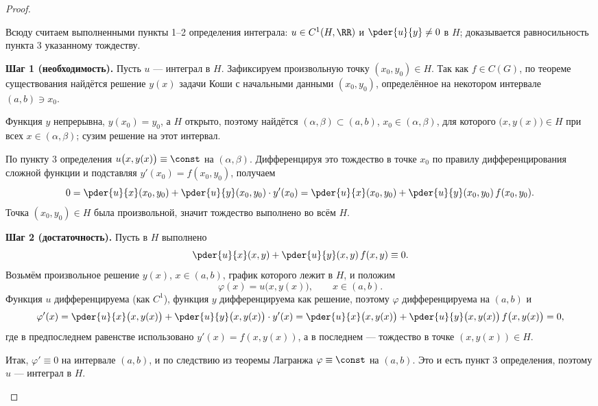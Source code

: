 \begin{proof}
	\begin{Addon}
		Всюду считаем выполненными пункты 1--2 определения интеграла:
		$u \in C^1(H,\RR)$ и $\pder{u}{y} \neq 0$ в $H$; доказывается
		равносильность пункта 3 указанному тождеству.

		\medskip
		\textbf{Шаг 1 (необходимость).} Пусть $u$ --- интеграл в $H$. Зафиксируем
		произвольную точку $(x_0,y_0) \in H$. Так как $f \in C(G)$, по теореме
		существования найдётся решение $y(x)$ задачи Коши с начальными данными
		$(x_0,y_0)$, определённое на некотором интервале $(a,b) \ni x_0$.

		Функция $y$ непрерывна, $y(x_0) = y_0$, а $H$ открыто, поэтому найдётся
		$(\alpha,\beta) \subset (a,b)$, $x_0 \in (\alpha,\beta)$, для которого
		$\bigl(x,y(x)\bigr) \in H$ при всех $x \in (\alpha,\beta)$; сузим решение
		на этот интервал.
	\end{Addon}

	По пункту 3 определения $u\bigl(x,y(x)\bigr) \equiv \const$ на
	$(\alpha,\beta)$. Дифференцируя это тождество в точке $x_0$ по правилу
	дифференцирования сложной функции и подставляя $y'(x_0) = f(x_0,y_0)$,
	получаем
	\[
	0 = \pder{u}{x}(x_0,y_0) + \pder{u}{y}(x_0,y_0)\cdot y'(x_0)
	  = \pder{u}{x}(x_0,y_0) + \pder{u}{y}(x_0,y_0)\, f(x_0,y_0).
	\]
	Точка $(x_0,y_0) \in H$ была произвольной, значит тождество выполнено
	во всём $H$.

	\medskip
	\begin{Addon}
		\textbf{Шаг 2 (достаточность).} Пусть в $H$ выполнено
		\[
		\pder{u}{x}(x,y) + \pder{u}{y}(x,y)\, f(x,y) \equiv 0.
		\]
		Возьмём произвольное решение $y(x)$, $x \in (a,b)$, график которого лежит
		в $H$, и положим
		\[
		\varphi(x) = u\bigl(x, y(x)\bigr), \qquad x \in (a,b).
		\]
		Функция $u$ дифференцируема (как $C^1$), функция $y$ дифференцируема как
		решение, поэтому $\varphi$ дифференцируема на $(a,b)$ и
		\[
		\varphi'(x)
		= \pder{u}{x}\bigl(x,y(x)\bigr) + \pder{u}{y}\bigl(x,y(x)\bigr)\cdot y'(x)
		= \pder{u}{x}\bigl(x,y(x)\bigr) + \pder{u}{y}\bigl(x,y(x)\bigr)\,
		  f\bigl(x,y(x)\bigr) = 0,
		\]
		где в предпоследнем равенстве использовано $y'(x) = f(x,y(x))$, а в
		последнем --- тождество в точке $(x,y(x)) \in H$.

		Итак, $\varphi' \equiv 0$ на интервале $(a,b)$, и по следствию из теоремы
		Лагранжа $\varphi \equiv \const$ на $(a,b)$. Это и есть пункт 3 определения,
		поэтому $u$ --- интеграл в $H$.\qedhere
	\end{Addon}
\end{proof}

